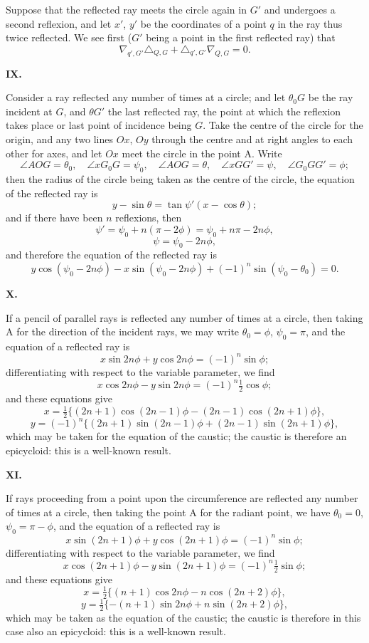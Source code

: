 \documentclass[11pt,a4paper]{article}
\begin{document}
Suppose that the reflected ray meets the circle again in $G'$ and undergoes a
second reflexion, and let $x'$, $y'$ be the coordinates of a point $q$ in the ray thus
twice reflected. We see first ($G'$ being a point in the first reflected ray) that
\[\nabla_{q',G'}\triangle_{Q,G} + \triangle_{q',G'}\nabla_{Q,G} = 0.\]

\medskip
\noindent\textbf{IX.}

Consider a ray reflected any number of times at a circle; and let $\theta_0G$
be the ray incident at $G$, and $\theta G'$ the last reflected ray, the point at which
the reflexion takes place or last point of incidence being $G$. Take the centre of
the circle for the origin, and any two lines $Ox$, $Oy$ through the centre and at
right angles to each other for axes, and let $Ox$ meet the circle in the point A.
Write
\[\angle AOG = \theta_0,\quad \angle xG_0G = \psi_0,\quad \angle AOG = \theta,\quad \angle xGG' = \psi,\quad \angle G_0GG' = \phi;\]
then the radius of the circle being taken as the centre of the circle, the equation
of the reflected ray is
\[y - \sin\theta = \tan\psi'(x - \cos\theta);\]
and if there have been $n$ reflexions, then
\[\psi' = \psi_0 + n(\pi - 2\phi) = \psi_0 + n\pi - 2n\phi,\]
\[\psi = \psi_0 - 2n\phi,\]
and therefore the equation of the reflected ray is
\[y\cos(\psi_0 - 2n\phi) - x\sin(\psi_0 - 2n\phi) + (-1)^n\sin(\psi_0 - \theta_0) = 0.\]

\medskip
\noindent\textbf{X.}

If a pencil of parallel rays is reflected any number of times at a circle, then
taking A for the direction of the incident rays, we may write $\theta_0 = \phi$,
$\psi_0 = \pi$, and the equation of a reflected ray is
\[x\sin 2n\phi + y\cos 2n\phi = (-1)^n\sin\phi;\]
differentiating with respect to the variable parameter, we find
\[x\cos 2n\phi - y\sin 2n\phi = (-1)^n\tfrac{1}{2}\cos\phi;\]
and these equations give
\[x = \tfrac{1}{2}\{(2n+1)\cos(2n-1)\phi - (2n-1)\cos(2n+1)\phi\},\]
\[y = (-1)^n\{(2n+1)\sin(2n-1)\phi + (2n-1)\sin(2n+1)\phi\},\]
which may be taken for the equation of the caustic; the caustic is therefore an
epicycloid: this is a well-known result.

\medskip
\noindent\textbf{XI.}

If rays proceeding from a point upon the circumference are reflected any
number of times at a circle, then taking the point A for the radiant point, we
have $\theta_0 = 0$, $\psi_0 = \pi - \phi$, and the equation of a reflected ray is
\[x\sin(2n+1)\phi + y\cos(2n+1)\phi = (-1)^n\sin\phi;\]
differentiating with respect to the variable parameter, we find
\[x\cos(2n+1)\phi - y\sin(2n+1)\phi = (-1)^n\tfrac{1}{2}\sin\phi;\]
and these equations give
\[x = \tfrac{1}{2}\{(n+1)\cos 2n\phi - n\cos(2n+2)\phi\},\]
\[y = \tfrac{1}{2}\{-(n+1)\sin 2n\phi + n\sin(2n+2)\phi\},\]
which may be taken as the equation of the caustic; the caustic is therefore in this
case also an epicycloid: this is a well-known result.
\end{document}

